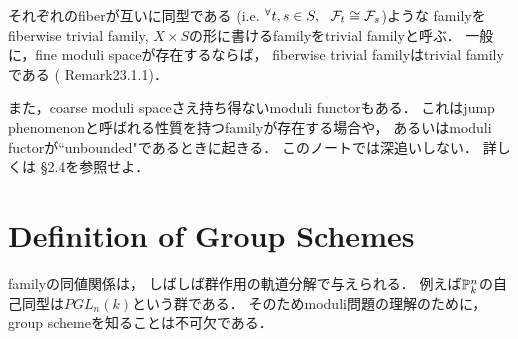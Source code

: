 \documentclass[a4paper]{jsarticle}
\newcommand{\famF}{\mathcal{F}}
\begin{document}
    それぞれのfiberが互いに同型である
    (i.e. $\Forall{t,s \in S} \famF_t \iso \famF_s$)ような
    familyをfiberwise trivial family, 
    $X \times S$の形に書けるfamilyをtrivial familyと呼ぶ．
    一般に，fine moduli spaceが存在するならば，
    fiberwise trivial familyはtrivial familyである
    (\cite{HarDef} Remark23.1.1)．

    また，coarse moduli spaceさえ持ち得ないmoduli functorもある．
    これはjump phenomenonと呼ばれる性質を持つfamilyが存在する場合や，
    あるいはmoduli fuctorが``unbounded"であるときに起きる．
    このノートでは深追いしない．
    詳しくは\cite{Hos} \S 2.4を参照せよ．

\section{Definition of Group Schemes}
    familyの同値関係は，
    しばしば群作用の軌道分解で与えられる．
    例えば$\mathbb{P}^n_k$の自己同型は$PGL_n(k)$という群である．
    そのためmoduli問題の理解のために，
    group schemeを知ることは不可欠である．
\end{document}
